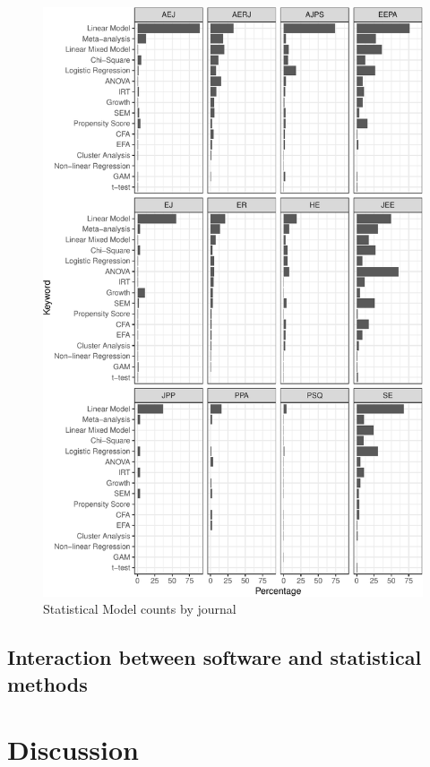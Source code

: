 \documentclass[english,,man]{apa6}
\theoremstyle{definition}
\theoremstyle{definition}
\theoremstyle{definition}
\theoremstyle{remark}
\begin{document}
\begin{figure}
\centering
\includegraphics{software_files/figure-latex/model-journal-1.pdf}
\caption{\label{fig:model-journal}Statistical Model counts by journal}
\end{figure}

\hypertarget{interaction-between-software-and-statistical-methods}{%
\subsection{Interaction between software and statistical
methods}\label{interaction-between-software-and-statistical-methods}}

\hypertarget{discussion}{%
\section{Discussion}\label{discussion}}
\end{document}
